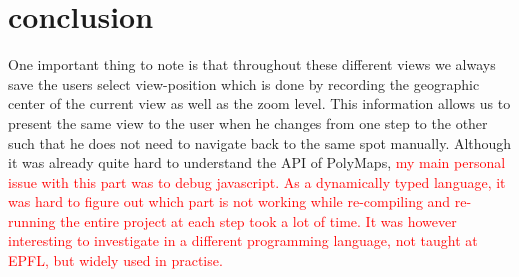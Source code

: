 \section{conclusion}
One important thing to note is that throughout these different views we always save the users select view-position which is done by recording the geographic center of the current view as well as the zoom level. This information allows us to present the same view to the user when he changes from one step to the other such that he does not need to navigate back to the same spot manually.
Although it was already quite hard to understand the API of PolyMaps, \textcolor{red}{my main personal issue with this part was to debug javascript. As a dynamically typed language, it was hard to figure out which part is not working while re-compiling and re-running the entire project at each step took a lot of time. It was however interesting to investigate in a different programming language, not taught at EPFL, but widely used in practise.}

